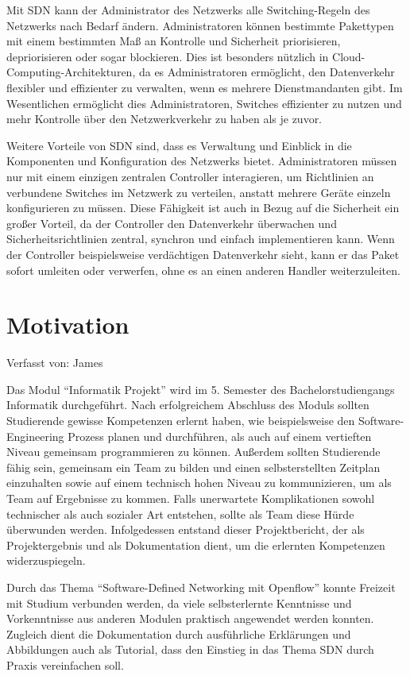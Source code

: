 \documentclass[fontsize=12pt,paper=a4,open=any,parskip=half,
  twoside=false,toc=listof,toc=bibliography,fleqn,leqno,
  captions=nooneline,captions=tableabove,british]{scrbook}
\begin{document}
Mit SDN kann der Administrator des Netzwerks alle Switching-Regeln des Netzwerks nach Bedarf ändern. Administratoren können bestimmte Pakettypen mit einem bestimmten Maß an Kontrolle und Sicherheit priorisieren, depriorisieren oder sogar blockieren. Dies ist besonders nützlich in Cloud-Computing-Architekturen, da es Administratoren ermöglicht, den Datenverkehr flexibler und effizienter zu verwalten, wenn es mehrere Dienstmandanten gibt. Im Wesentlichen ermöglicht dies Administratoren, Switches effizienter zu nutzen und mehr Kontrolle über den Netzwerkverkehr zu haben als je zuvor. \cite{cloudcomputing}


Weitere Vorteile von SDN sind, dass es Verwaltung und Einblick in die Komponenten und Konfiguration des Netzwerks bietet. Administratoren müssen nur mit einem einzigen zentralen Controller interagieren, um Richtlinien an verbundene Switches im Netzwerk zu verteilen, anstatt mehrere Geräte einzeln konfigurieren zu müssen. Diese Fähigkeit ist auch in Bezug auf die Sicherheit ein großer Vorteil, da der Controller den Datenverkehr überwachen und Sicherheitsrichtlinien zentral, synchron und einfach implementieren kann. Wenn der Controller beispielsweise verdächtigen Datenverkehr sieht, kann er das Paket sofort umleiten oder verwerfen, ohne es an einen anderen Handler weiterzuleiten.\cite{sdnbenefitstung}


\newpage
\section{Motivation}
{\tiny Verfasst von: James\par}
Das Modul “Informatik Projekt” wird im 5. Semester des Bachelorstudiengangs Informatik durchgeführt. Nach erfolgreichem Abschluss des Moduls sollten Studierende gewisse Kompetenzen erlernt haben, wie beispielsweise den Software-Engineering Prozess planen und durchführen, als auch auf einem vertieften Niveau gemeinsam programmieren zu können. Außerdem sollten Studierende fähig sein, gemeinsam ein Team zu bilden und einen selbsterstellten Zeitplan einzuhalten sowie auf einem technisch hohen Niveau zu kommunizieren, um als Team auf Ergebnisse zu kommen. Falls unerwartete Komplikationen sowohl technischer als auch sozialer Art entstehen, sollte als Team diese Hürde überwunden werden. Infolgedessen entstand dieser Projektbericht, der als Projektergebnis und als Dokumentation dient, um die erlernten Kompetenzen widerzuspiegeln.\par
Durch das Thema “Software-Defined Networking mit Openflow” konnte Freizeit mit Studium verbunden werden, da viele selbsterlernte Kenntnisse und Vorkenntnisse aus anderen Modulen praktisch angewendet werden konnten. Zugleich dient die Dokumentation durch ausführliche Erklärungen und Abbildungen auch als Tutorial, dass den Einstieg in das Thema SDN durch Praxis vereinfachen soll.
\end{document}
